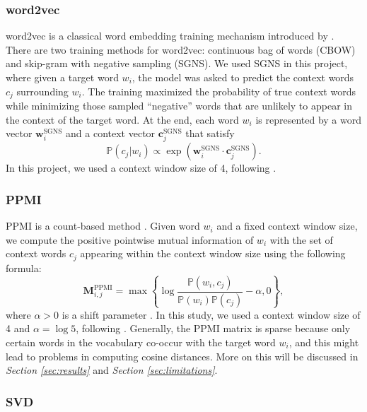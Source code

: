 \documentclass[11pt]{article}
\begin{document}
\subsubsection{word2vec}

word2vec is a classical word embedding training mechanism introduced by \citet{mikolov2013efficientestimationwordrepresentations}. There are two training methods for word2vec: continuous bag of words (CBOW) and skip-gram with negative sampling (SGNS). We used SGNS in this project, where given a target word \( w_i \), the model was asked to predict the context words \( c_j \) surrounding \( w_i \). The training maximized the probability of true context words while minimizing those sampled ``negative'' words that are unlikely to appear in the context of the target word. At the end, each word \( w_i \) is represented by a word vector \( \mathbf{w}_i^{\text{SGNS}} \) and a context vector \( \mathbf{c}_j^{\text{SGNS}} \) that satisfy
\[ \mathbb{P}(c_j|w_i) \propto \exp(\mathbf{w}_i^{\text{SGNS}} \cdot \mathbf{c}_j^{\text{SGNS}}). \]
In this project, we used a context window size of 4, following \citet{hamilton2016diachronic}.

\subsubsection{PPMI}

PPMI is a count-based method \cite{levy-etal-2015-improving}. Given word \( w_i \) and a fixed context window size, we compute the positive pointwise mutual information of \( w_i \) with the set of context words \( c_j \) appearing within the context window size using the following formula:
\[ \mathbf{M}_{i, j}^{\text{PPMI}} = \max\left\{ \log{\frac{\mathbb{P}(w_i, c_j)}{\mathbb{P}(w_i)\mathbb{P}(c_j)}} - \alpha, 0 \right\}, \]
where \( \alpha > 0 \) is a shift parameter \cite{hamilton2016diachronic}. In this study, we used a context window size of 4 and \( \alpha = \log 5 \), following \citet{hamilton2016diachronic}. Generally, the PPMI matrix is sparse because only certain words in the vocabulary co-occur with the target word \( w_i \), and this might lead to problems in computing cosine distances. More on this will be discussed in \textit{Section \ref{sec:results}} and \textit{Section \ref{sec:limitations}}.

\subsubsection{SVD}
\end{document}
